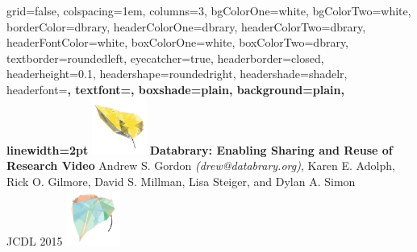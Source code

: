 \documentclass[landscape,final,a0paper,fontscale=0.285]{baposter}
\begin{document}


\begin{poster}%
  {
  grid=false,
  colspacing=1em,
  columns=3,
  bgColorOne=white,
  bgColorTwo=white,
  borderColor=dbrary,
  headerColorOne=dbrary,
  headerColorTwo=dbrary,
  headerFontColor=white,
  boxColorOne=white,
  boxColorTwo=dbrary,
  textborder=roundedleft,
  eyecatcher=true,
  headerborder=closed,
  headerheight=0.1\textheight,
  headershape=roundedright,
  headershade=shadelr,
  headerfont=\Large\bf\textsc, %
  textfont={\setlength{\parindent}{1.5em}},
  boxshade=plain,
  background=plain,
  linewidth=2pt
  }
  {
    \includegraphics[height=5em]{img/datavyu-leaf-large.png}
  } 
  {\bf{Databrary: Enabling Sharing and Reuse of Research Video} }
  { Andrew S. Gordon \emph{(drew@databrary.org)}, Karen E. Adolph, Rick O. Gilmore, David S. Millman, Lisa Steiger, and Dylan A. Simon \\
  JCDL 2015}
  {
    \includegraphics[height=5em]{img/databrary-leaf-large.png}
  }



\end{poster}
\end{document}
